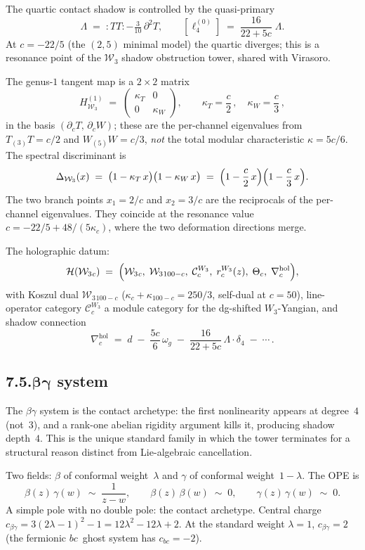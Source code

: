 \documentclass[11pt]{report}
\theoremstyle{definition}
\theoremstyle{remark}
\providecommand{\cC}{\mathcal{C}}
\numberwithin{equation}{section}
\begin{document}
The quartic contact shadow is controlled by the quasi-primary
\[
\Lambda\;=\;{:}TT{:}-\tfrac{3}{10}\,\partial^2 T,
\qquad
[\ell_4^{(0)}]
\;=\;
\frac{16}{22+5c}\;\Lambda.
\]
At $c=-22/5$ (the $(2,5)$ minimal model) the quartic diverges;
this is a resonance point of the $\mathcal W_3$ shadow obstruction tower,
shared with Virasoro.

The genus-$1$ tangent map is a $2\times 2$ matrix
\[
H^{(1)}_{\mathcal W_3}
\;=\;
\begin{pmatrix}
\kappa_T & 0 \\[2pt]
0 & \kappa_W
\end{pmatrix},
\qquad
\kappa_T = \frac{c}{2}\,,
\quad
\kappa_W = \frac{c}{3}\,,
\]
in the basis $(\partial_c T,\,\partial_c W)$; these are the
per-channel eigenvalues from $T_{(3)}T=c/2$ and $W_{(5)}W=c/3$,
\emph{not} the total modular
characteristic $\kappa=5c/6$. The spectral discriminant is
\[
\Delta_{\mathcal W_3}(x)
\;=\;
\bigl(1-\kappa_T\,x\bigr)
\bigl(1-\kappa_W\,x\bigr)
\;=\;
\Bigl(1-\frac{c}{2}\,x\Bigr)
\Bigl(1-\frac{c}{3}\,x\Bigr).
\]
The two branch points $x_1=2/c$ and
$x_2=3/c$ are the reciprocals of the
per-channel eigenvalues.
They coincide at the resonance value
$c=-22/5+48/(5\kappa_c)$, where the two deformation
directions merge.

The holographic datum:
\[
\mathcal H(\mathcal W_3{}_c)
\;=\;
\Bigl(
\mathcal W_3{}_c,\;
\mathcal W_3{}_{100-c},\;
\cC_c^{W_3},\;
r_c^{W_3}(z),\;
\Theta_c,\;
\nabla^{\mathrm{hol}}_c
\Bigr),
\]
with Koszul dual $\mathcal W_3{}_{100-c}$
($\kappa_c+\kappa_{100-c}=250/3$, self-dual at $c = 50$), line-operator category
$\cC_c^{W_3}$ a module category for the dg-shifted $W_3$-Yangian,
and shadow connection
\[
\nabla^{\mathrm{hol}}_c
\;=\;
d
\;-\;\frac{5c}{6}\,\omega_g
\;-\;\frac{16}{22+5c}\,\Lambda\cdot\delta_4
\;-\;\cdots\,.
\]

\subsection*{7.5.\quad $\boldsymbol{\beta\gamma}$ system}

The $\beta\gamma$ system is the contact archetype: the first
nonlinearity appears at degree~$4$ (not~$3$), and a rank-one abelian
rigidity argument kills it, producing shadow depth~$4$. This is the
unique standard family in which the tower terminates for a structural
reason distinct from Lie-algebraic cancellation.

Two fields: $\beta$ of conformal weight~$\lambda$ and $\gamma$ of
conformal weight~$1-\lambda$. The OPE is
\[
\beta(z)\,\gamma(w)
\;\sim\;
\frac{1}{z-w},
\qquad
\beta(z)\,\beta(w)\;\sim\;0,
\qquad
\gamma(z)\,\gamma(w)\;\sim\;0.
\]
A simple pole with no double pole: the contact archetype. Central
charge $c_{\beta\gamma}=3(2\lambda-1)^2-1=12\lambda^2-12\lambda+2$.
At the standard weight $\lambda=1$, $c_{\beta\gamma}=2$
(the fermionic $bc$~ghost system has $c_{bc}=-2$).
\end{document}
